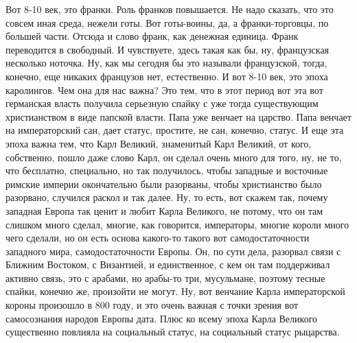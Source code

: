 Вот 8-10 век, это франки. Роль
франков повышается. Не надо сказать, что это совсем иная среда, нежели готы. Вот
готы-воины, да, а франки-торговцы, по большей части. Отсюда и слово франк, как
денежная единица. Франк переводится в свободный. И чувствуете, здесь такая как
бы, ну, французская несколько ноточка. Ну, как мы сегодня бы это называли
французской, тогда, конечно, еще никаких французов нет, естественно. И вот 8-10
век, это эпоха каролингов. Чем она для нас важна? Это тем, что в этот период вот
эта вот германская власть получила серьезную спайку с уже тогда существующим
христианством в виде папской власти. Папа уже венчает на царство. Папа венчает
на императорский сан, дает статус, простите, не сан, конечно, статус. И еще эта
эпоха важна тем, что Карл Великий, знаменитый Карл Великий, от кого, собственно,
пошло даже слово Карл, он сделал очень много для того, ну, не то, что бесплатно,
специально, но так получилось, чтобы западные и восточные римские империи
окончательно были разорваны, чтобы христианство было разорвано, случился раскол
и так далее. Ну, то есть, вот скажем так, почему западная Европа так ценит и
любит Карла Великого, не потому, что он там слишком много сделал, многие, как
говорится, императоры, многие короли много чего сделали, но он есть основа
какого-то такого вот самодостаточности западного мира, самодостаточности Европы.
Он, по сути дела, разорвал связи с Ближним Востоком, с Византией, и
единственное, с кем он там поддерживал активно связь, это с арабами, но арабы-то
три, мусульмане, поэтому тесные спайки, конечно же, произойти не могут. Ну, вот
венчание Карла императорской короны произошло в 800 году, и это очень важная с
точки зрения вот самосознания народов Европы дата. Плюс ко всему эпоха Карла
Великого существенно повлияла на социальный статус, на социальный статус
рыцарства. 

